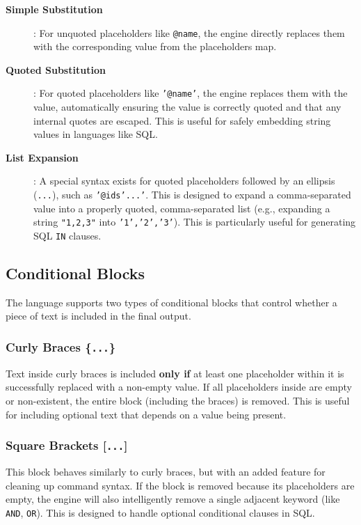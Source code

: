 \begin{description}
\item[\textbf{Simple Substitution}]: For unquoted placeholders like \texttt{@name}, the engine directly replaces them with the corresponding value from the placeholders map.

\item[\textbf{Quoted Substitution}]: For quoted placeholders like \texttt{'@name'}, the engine replaces them with the value, automatically ensuring the value is correctly quoted and that any internal quotes are escaped. This is useful for safely embedding string values in languages like SQL.

\item[\textbf{List Expansion}]: A special syntax exists for quoted placeholders followed by an ellipsis (\texttt{...}), such as \texttt{'@ids'...'}. This is designed to expand a comma-separated value into a properly quoted, comma-separated list (e.g., expanding a string \texttt{"1,2,3"} into \texttt{'1','2','3'}). This is particularly useful for generating SQL \texttt{IN} clauses.
\end{description}

\subsection{Conditional Blocks}

The language supports two types of conditional blocks that control whether a piece of text is included in the final output.

\subsubsection{Curly Braces \{\texttt{...}\}}

Text inside curly braces is included \textbf{only if} at least one placeholder within it is successfully replaced with a non-empty value. If all placeholders inside are empty or non-existent, the entire block (including the braces) is removed. This is useful for including optional text that depends on a value being present.

\subsubsection{Square Brackets [\texttt{...}]}

This block behaves similarly to curly braces, but with an added feature for cleaning up command syntax. If the block is removed because its placeholders are empty, the engine will also intelligently remove a single adjacent keyword (like \texttt{AND}, \texttt{OR}). This is designed to handle optional conditional clauses in SQL.

